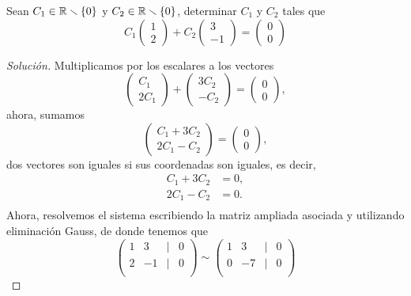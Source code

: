 \documentclass[a4,11pt]{aleph-notas}
\begin{document}
\begin{ejer}
    Sean $C_1 \in \mathbb{R} \smallsetminus \{ 0 \}$ y $C_2 \in \mathbb{R} \smallsetminus \{ 0 \}$, determinar $C_1$ y $C_2$ tales que
    \[
    C_1 \begin{pmatrix} 1 \\ 2 \end{pmatrix} + C_2 \begin{pmatrix} 3 \\ -1 \end{pmatrix} = \begin{pmatrix} 0 \\ 0 \end{pmatrix}
    \]
\end{ejer}

\begin{proof}[Solución]\hspace{0pt}
    Multiplicamos por los escalares a los vectores
    \[
    \begin{pmatrix} C_1 \\ 2C_1 \end{pmatrix} + \begin{pmatrix} 3C_2 \\ -C_2 \end{pmatrix} = \begin{pmatrix} 0 \\ 0 \end{pmatrix},
    \]
    ahora, sumamos
    \[
    \begin{pmatrix} C_1 + 3C_2 \\ 2C_1 - C_2 \end{pmatrix}  = \begin{pmatrix} 0 \\ 0 \end{pmatrix},
    \]
    dos vectores son iguales si sus coordenadas son iguales, es decir,
    \begin{align*}
        C_1+3C_2&=0,\\
        2C_1- C_2&=0.\\
    \end{align*}
    Ahora, resolvemos el sistema escribiendo la matriz ampliada asociada y utilizando eliminación Gauss, de donde tenemos que
    \[
    \begin{pmatrix}
    1 & 3 & | & 0 \\ 2 & -1 & | & 0 \\
    \end{pmatrix}
    \sim
    \begin{pmatrix}
    1 & 3 & | & 0 \\ 0 & -7 & | & 0 \\

\end{pmatrix}\]
\end{proof}
\end{document}
